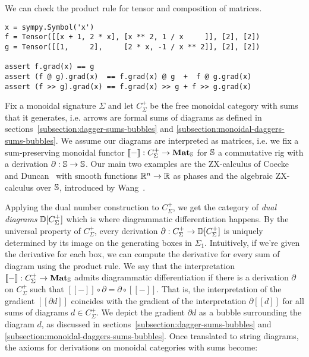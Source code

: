 \begin{example}
We can check the product rule for tensor and composition of matrices.

\begin{verbatim}
x = sympy.Symbol('x')
f = Tensor([[x + 1, 2 * x], [x ** 2, 1 / x     ]], [2], [2])
g = Tensor([[1,     2],     [2 * x, -1 / x ** 2]], [2], [2])

assert f.grad(x) == g
assert (f @ g).grad(x)  == f.grad(x) @ g  +  f @ g.grad(x)
assert (f >> g).grad(x) == f.grad(x) >> g + f >> g.grad(x)
\end{verbatim}
\end{example}

Fix a monoidal signature $\Sigma$ and let $C_\Sigma^+$ be the free monoidal category with sums that it generates, i.e. arrows are formal sums of diagrams as defined in sections~\ref{subsection:dagger-sums-bubbles} and \ref{subsection:monoidal-daggers-sums-bubbles}.
We assume our diagrams are interpreted as matrices, i.e. we fix a sum-preserving monoidal functor $[\![-]\!]  : C_\Sigma^+ \to \mathbf{Mat}_\S$ for $\S$ a commutative rig with a derivation $\partial : \S \to \S$.
Our main two examples are the ZX-calculus of Coecke and Duncan~\cite{CoeckeDuncan08} with smooth functions $\R^n \to \R$ as phases and the algebraic ZX-calculus over $\S$, introduced by Wang~\cite{Wang20}.

Applying the dual number construction to $C_\Sigma^+$, we get the category of \emph{dual diagrams} $\D[C_\Sigma^+]$ which is where diagrammatic differentiation happens.
By the universal property of $C_\Sigma^+$, every derivation $\partial : C_\Sigma^+ \to \D[C_\Sigma^+]$ is uniquely determined by its image on the generating boxes in $\Sigma_1$.
Intuitively, if we're given the derivative for each box, we can compute the derivative for every sum of diagram using the product rule.
We say that the interpretation $[\![-]\!] : C_\Sigma^+ \to \mathbf{Mat}_\S$ admits diagrammatic differentiation if there is a derivation $\partial$ on $C_\Sigma^+$ such that $[\![-]\!] \circ \partial = \partial \circ [\![-]\!]$.
That is, the interpretation of the gradient $[\![\partial d]\!]$ coincides with the gradient of the interpretation $\partial [\![d]\!]$ for all sums of diagrams $d \in C_\Sigma^+$.
We depict the gradient $\partial d$ as a bubble surrounding the diagram $d$, as discussed in sections~\ref{subsection:dagger-sums-bubbles} and \ref{subsection:monoidal-daggers-sums-bubbles}.
Once translated to string diagrams, the axioms for derivations on monoidal
categories with sums become:

